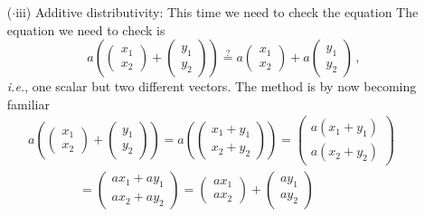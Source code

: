 {\begin{enumerate}
\begin{gather*}
=
a\begin{pmatrix}x_1\\x_2\end{pmatrix}+
b\begin{pmatrix} x_1\\x_2\end{pmatrix}\, ,
\end{gather*}
as required.
\item[($\cdot$iii)] Additive distributivity:
This time we need to check the equation
The equation we need to check is
\[
a\left(
\begin{pmatrix}x_1\\x_2\end{pmatrix}
+
\begin{pmatrix}y_1\\y_2\end{pmatrix}\right)\stackrel?=
a\begin{pmatrix}x_1\\x_2\end{pmatrix}+
a\begin{pmatrix}y_1\\y_2\end{pmatrix}
\, ,
\] 
{\it i.e.}, one scalar but two different vectors.
The method is by now becoming familiar
\begin{gather*}
a\left(
\begin{pmatrix}x_1\\x_2\end{pmatrix}
+
\begin{pmatrix}y_1\\y_2\end{pmatrix}\right)=
a\left(
\begin{pmatrix}x_1+y_1\\x_2+y_2\end{pmatrix}
\right)
=
\begin{pmatrix}a(x_1+y_1)\\a(x_2+y_2)\end{pmatrix}
\qquad\\\qquad\qquad=
\begin{pmatrix}ax_1+ay_1\\ax_2+ay_2\end{pmatrix}
=
\begin{pmatrix}ax_1\\ax_2\end{pmatrix}+
\begin{pmatrix}ay_1\\ay_2\end{pmatrix}

\end{gather*}
\end{enumerate}}
